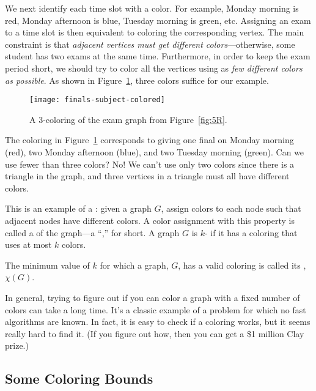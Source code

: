We next identify each time slot with a color.  For example, Monday
morning is red, Monday afternoon is blue, Tuesday morning is green,
etc.  Assigning an exam to a time slot is then equivalent to coloring
the corresponding vertex.  The main constraint is that \emph{adjacent
  vertices must get different colors}---otherwise, some student has
two exams at the same time.  Furthermore, in order to keep the exam
period short, we should try to color all the vertices using as
\emph{few different colors as possible}.  As shown in Figure~\ref{fig:5S},
three colors suffice for our example.

\begin{figure}\redrawn

\texttt{[image: finals-subject-colored]}

\caption{A 3-coloring of the exam graph from Figure~\ref{fig:5R}.}

\label{fig:5S}

\end{figure}

The coloring in Figure~\ref{fig:5S} corresponds to giving one final on
Monday morning (red), two Monday afternoon (blue), and two Tuesday
morning (green).  Can we use fewer than three colors?  No! We can't
use only two colors since there is a triangle in the graph, and three
vertices in a triangle must all have different colors.

This is an example of a : given a graph
$G$, assign colors to each node such that adjacent nodes have
different colors.  A color assignment with this property is called a
 of the graph---a ``,'' for short.
A graph $G$ is $k$- if it has a coloring that uses at
most $k$ colors.
\begin{definition}
  The minimum value of $k$ for which a graph, $G$, has a valid coloring is
  called its , $\chi(G)$.
\end{definition}

In general, trying to figure out if you can color a graph with a fixed
number of colors can take a long time.  It's a classic example of a
problem for which no fast algorithms are known.  In fact, it is easy to
check if a coloring works, but it seems really hard to find it. (If you
figure out how, then you can get a \$1 million Clay prize.)


\subsection{Some Coloring Bounds}

